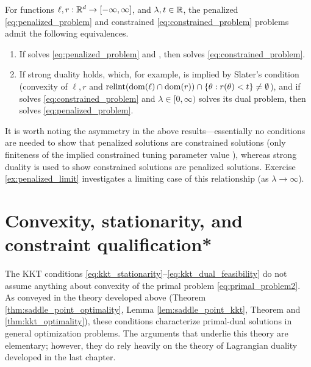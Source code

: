 \begin{Theorem}
\label{thm:constrained_penalized}
For functions $\ell,r : \mathbb{R}^d \to [-\infty, \infty]$, and $\lambda,t \in \mathbb{R}$, the
penalized \eqref{eq:penalized_problem} and constrained
\eqref{eq:constrained_problem} problems admit the following equivalences.     

\begin{enumerate}[label=(\roman*)]
\item If \smash{$\htheta$} solves \eqref{eq:penalized_problem} and , then \smash{$\htheta$} solves
  \eqref{eq:constrained_problem}. 

\item If strong duality holds, which, for example, is implied by Slater's 
  condition (convexity of $\ell,r$ and $\operatorname{relint}(\operatorname{dom}(\ell) \cap \operatorname{dom}(r)) \cap \{
  \theta : r(\theta) < t\} \not= \emptyset$), and if \smash{$\htheta$} solves
  \eqref{eq:constrained_problem} and $\lambda \in [0,\infty)$ solves its dual
  problem, then \smash{$\htheta$} solves \eqref{eq:penalized_problem}.     
\end{enumerate} 
\end{Theorem}

It is worth noting the asymmetry in the above results---essentially no
conditions are needed to show that penalized solutions are constrained solutions
(only finiteness of the implied constrained tuning parameter value ), whereas strong duality is used to show constrained solutions
are penalized solutions. Exercise \ref{ex:penalized_limit} investigates a
limiting case of this relationship (as $\lambda \to \infty$).

\section{Convexity, stationarity, and constraint qualification*} 
\label{sec:convexity_stationarity_cq}

The KKT conditions \eqref{eq:kkt_stationarity}--\eqref{eq:kkt_dual_feasibility}
do not assume anything about convexity of the primal problem
\eqref{eq:primal_problem2}. As conveyed in the theory developed above (Theorem  
\ref{thm:saddle_point_optimality}, Lemma \ref{lem:saddle_point_kkt}, Theorem
and \ref{thm:kkt_optimality}), these conditions characterize primal-dual solutions
in general optimization problems. The arguments that underlie this theory are
elementary; however, they do rely heavily on the theory of Lagrangian duality
developed in the last chapter.   

